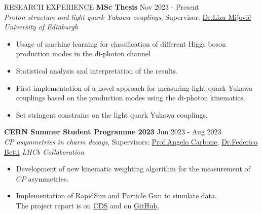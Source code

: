 \documentclass{resume} %
\begin{document}
        \begin{rSection}{RESEARCH EXPERIENCE}
                \textbf{MSc Thesis} \hfill Nov 2023 - Present\\
                {\it Proton structure and light quark Yukawa couplings}, Supervisor: \href{https://www.ph.ed.ac.uk/people/liza-mijovic}{Dr.\@ Liza Mijovi\'c} \hfill \textit{University of Edinburgh}
                \begin{itemize}
                        \item Usage of machine learning for classification of different Higgs boson production modes in the di-photon channel
                        \item Statistical analysis and interpretation of the results.
                        \item First implementation of a novel approach for measuring light quark Yukawa couplings based on the production modes using the di-photon kinematics.
                        \item Set stringent constrains on the light quark Yukawa couplings.
                \end{itemize}

                \textbf{CERN Summer Student Programme 2023} \hfill Jun 2023 - Aug 2023\\
                {\it CP asymmetries in charm decays}, Supervisors: \href{https://www.unibo.it/sitoweb/angelo.carbone/en}{Prof.\@ Angelo Carbone}, \href{https://www.ph.ed.ac.uk/people/federico-betti}{Dr.\@ Federico Betti}
                \hfill \textit{LHCb Collaboration}
                \begin{itemize}
                        \itemsep -3pt {}
                        \item Development of new kinematic weighting algorithm for the measurement of $CP$ asymmetries.
                        \item Implementation of RapidSim and Particle Gun to simulate data.\\ The project report is on \href{https://cds.cern.ch/record/2866568/}{CDS} and on \href{https://github.com/GiorgosChr/CERN_Summer_Student_Programme_2023}{GitHub}.
                \end{itemize}


\end{rSection}
\end{document}
